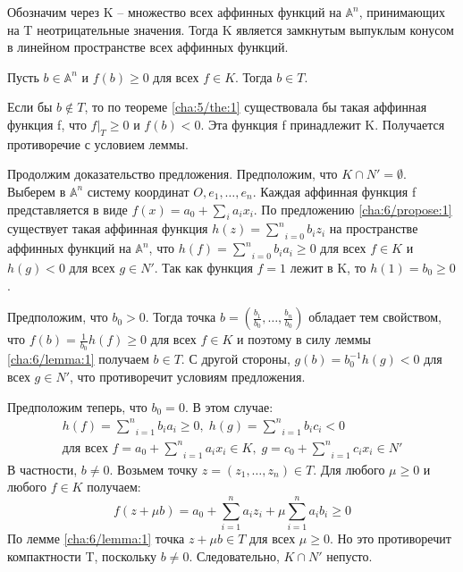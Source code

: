 \begin{Proof}
	Обозначим через K – множество всех аффинных функций на $\mathbb{A}^n$, принимающих на T неотрицательные значения. Тогда K является замкнутым выпуклым конусом в линейном пространстве всех аффинных функций.

	\begin{lemma}\label{cha:6/lemma:1}
		Пусть $b \in \mathbb{A}^n$ и $f(b) \ge 0$ для всех $f \in K$. Тогда $b \in T$.
	\end{lemma}
	\begin{Proof}
		Если бы $b \not \in T$, то по теореме \ref{cha:5/the:1} существовала бы такая аффинная функция f, что $f |_T \ge 0$ и $f(b) < 0$. Эта функция f принадлежит K. Получается противоречие с условием леммы.
	\end{Proof}

	Продолжим доказательство предложения. Предположим, что $K \cap N' = \emptyset$. Выберем в $\mathbb{A}^n$ систему координат $O, e_1, \dots, e_n$. Каждая аффинная функция f представляется в виде $f(x) = a_0 + \underset{i}{\overset{}{\sum}} a_i x_i$. По предложению \ref{cha:6/propose:1} существует такая аффинная функция $h(z) = \underset{i=0}{\overset{n}{\sum}} b_i z_i$ на пространстве аффинных функций на $\mathbb{A}^n$, что $h(f) = \underset{i=0}{\overset{n}{\sum}} b_i a_i \ge 0$ для всех $f \in K$ и $h(g) < 0$ для всех $g \in N'$. Так как функция $f = 1$ лежит в K, то $h(1) = b_0 \ge 0$.

	Предположим, что $b_0 > 0$. Тогда точка $b = \left( \frac{b_1}{b_0}, \dots, \frac{b_n}{b_0} \right)$ обладает тем свойством, что $f(b) = \frac{1}{b_0} h(f) \ge 0$ для всех $f \in K$ и поэтому в силу леммы \ref{cha:6/lemma:1} получаем $b \in T$. С другой стороны, $g(b) = b_0^{−1} h(g) < 0$ для всех $g \in N'$, что противоречит условиям предложения.

	Предположим теперь, что $b_0 = 0$. В этом случае:
	$$\begin{gathered}
		h(f) = \underset{i=1}{\overset{n}{\sum}}b_i a_i \ge 0, \; h(g) = \underset{i=1}{\overset{n}{\sum}}b_i c_i < 0 \\
		\text{для всех } f = a_0 + \underset{i=1}{\overset{n}{\sum}}a_i x_i \in K, \; g = c_0 + \underset{i=1}{\overset{n}{\sum}}c_i x_i \in N'
	\end{gathered}$$
	В частности, $b \not = 0$. Возьмем точку $z = (z_1, \dots, z_n) \in T$. Для любого $\mu \ge 0$ и любого $f \in K$ получаем:
	$$f(z + \mu b) = a_0 + \underset{i=1}{\overset{n}{\sum}}a_i z_i + \mu \underset{i=1}{\overset{n}{\sum}}a_i b_i \ge 0$$
	По лемме \ref{cha:6/lemma:1} точка $z + \mu b \in T$ для всех $\mu \ge 0$. Но это противоречит компактности T, поскольку $b \not = 0$. Следовательно, $K \cap N'$ непусто.
\end{Proof}

